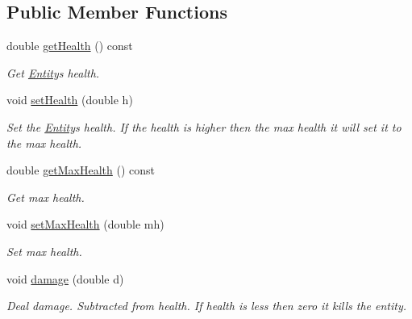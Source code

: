 \subsection*{Public Member Functions}
\begin{DoxyCompactItemize}
\item 
\mbox{\label{classEntity_a7d65c1c4303715382272f6065e29ac03}} 
double \hyperlink{classEntity_a7d65c1c4303715382272f6065e29ac03}{get\+Health} () const
\begin{DoxyCompactList}\small\item\em Get \hyperlink{classEntity}{Entity}\textquotesingle{}s health. \end{DoxyCompactList}\item 
\mbox{\label{classEntity_a4f521d321ea874c474cc0506ff78da08}} 
void \hyperlink{classEntity_a4f521d321ea874c474cc0506ff78da08}{set\+Health} (double h)
\begin{DoxyCompactList}\small\item\em Set the \hyperlink{classEntity}{Entity}\textquotesingle{}s health. If the health is higher then the max health it will set it to the max health. \end{DoxyCompactList}\item 
\mbox{\label{classEntity_ad1e0ca19eb67af423f6803b52b351618}} 
double \hyperlink{classEntity_ad1e0ca19eb67af423f6803b52b351618}{get\+Max\+Health} () const
\begin{DoxyCompactList}\small\item\em Get max health. \end{DoxyCompactList}\item 
\mbox{\label{classEntity_a375385b808ac7fd4632d6b71f15b0e1c}} 
void \hyperlink{classEntity_a375385b808ac7fd4632d6b71f15b0e1c}{set\+Max\+Health} (double mh)
\begin{DoxyCompactList}\small\item\em Set max health. \end{DoxyCompactList}\item 
\mbox{\label{classEntity_af7fb432e778f9fcfe4584d09b6a73294}} 
void \hyperlink{classEntity_af7fb432e778f9fcfe4584d09b6a73294}{damage} (double d)
\begin{DoxyCompactList}\small\item\em Deal damage. Subtracted from health. If health is less then zero it kills the entity. \end{DoxyCompactList}\item 

\end{DoxyCompactItemize}

